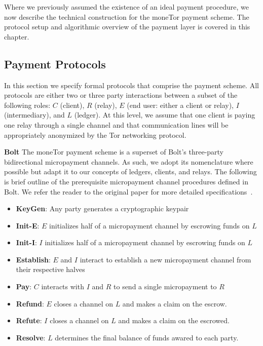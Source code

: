 Where we previously assumed the existence of an ideal payment procedure, we now
describe the technical construction for the moneTor payment scheme. The protocol
setup and algorithmic overview of the payment layer is covered in this chapter.

\subsection{Payment Protocols}

In this section we specify formal protocols that comprise the payment
scheme. All protocols are either two or three party interactions between a
subset of the following roles: $C$ (client), $R$ (relay), $E$ (end user: either
a client or relay), $I$ (intermediary), and $L$ (ledger). At this level, we
assume that one client is paying one relay through a single channel and that
communication lines will be appropriately anonymized by the Tor networking
protocol.

\textbf{Bolt} The moneTor payment scheme is a superset of Bolt's three-party
bidirectional micropayment channels. As such, we adopt its nomenclature where
possible but adapt it to our concepts of ledgers, clients, and relays. The
following is brief outline of the prerequisite micropayment channel procedures
defined in Bolt. We refer the reader to the original paper for more detailed
specifications~\cite{green2017bolt}.

\begin{itemize}
\item \textbf{KeyGen}: Any party generates a cryptographic keypair
\item \textbf{Init-E}: $E$ initializes half of a micropayment channel by
  escrowing funds on $L$
\item \textbf{Init-I}: $I$ initializes half of a micropayment channel by
  escrowing funds on $L$
\item \textbf{Establish}: $E$ and $I$ interact to establish a new micropayment
  channel from their respective halves
\item \textbf{Pay}: $C$ interacts with $I$ and $R$ to send a single micropayment to $R$
\item \textbf{Refund}: $E$ closes a channel on $L$ and makes a claim on
  the escrow.
\item \textbf{Refute}: $I$ closes a channel on $L$ and makes a claim on
  the escrowed.
\item \textbf{Resolve}: $L$ determines the final balance of funds awared to
  each party.
\end{itemize}

